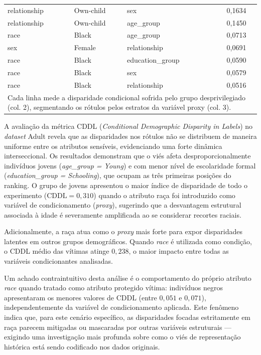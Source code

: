 \begin{table}[H]
{\begin{tabular}{lll|c}
        relationship & Own-child & sex & 0,1634 \\
        relationship & Own-child & age\_group & 0,1450 \\
        race & Black & age\_group & 0,0713 \\
        sex & Female & relationship & 0,0691 \\
        race & Black & education\_group & 0,0590 \\
        race & Black & sex & 0,0579 \\
        race & Black & relationship & 0,0516 \\
        \hline
        \multicolumn{4}{l}{\small Cada linha mede a disparidade condicional sofrida pelo grupo desprivilegiado (col. 2), segmentando os rótulos pelos estratos da variável proxy (col. 3).}
    \end{tabular}
    }
    \label{tab:adult_cddl}
\end{table}

A avaliação da métrica CDDL (\textit{Conditional Demographic Disparity in Labels}) no \textit{dataset} Adult revela que as disparidades nos rótulos não se distribuem de maneira uniforme entre os atributos sensíveis, evidenciando uma forte dinâmica interseccional. Os resultados demonstram que o viés afeta desproporcionalmente indivíduos jovens (\textit{age\_group = Young}) e com menor nível de escolaridade formal (\textit{education\_group = Schooling}), que ocupam as três primeiras posições do ranking. O grupo de jovens apresentou o maior índice de disparidade de todo o experimento ($\text{CDDL} = 0,310$) quando o atributo raça foi introduzido como variável de condicionamento (\textit{proxy}), sugerindo que a desvantagem estrutural associada à idade é severamente amplificada ao se considerar recortes raciais.

Adicionalmente, a raça atua como o \textit{proxy} mais forte para expor disparidades latentes em outros grupos demográficos. Quando \textit{race} é utilizada como condição, o CDDL médio das vítimas atinge $0,238$, o maior impacto entre todas as variáveis condicionantes analisadas.

Um achado contraintuitivo desta análise é o comportamento do próprio atributo \textit{race} quando tratado como atributo protegido vítima: indivíduos negros apresentaram os menores valores de CDDL (entre $0,051$ e $0,071$), independentemente da variável de condicionamento aplicada. Este fenômeno indica que, para este cenário específico, as disparidades focadas estritamente em raça parecem mitigadas ou mascaradas por outras variáveis estruturais --- exigindo uma investigação mais profunda sobre como o viés de representação histórica está sendo codificado nos dados originais.

